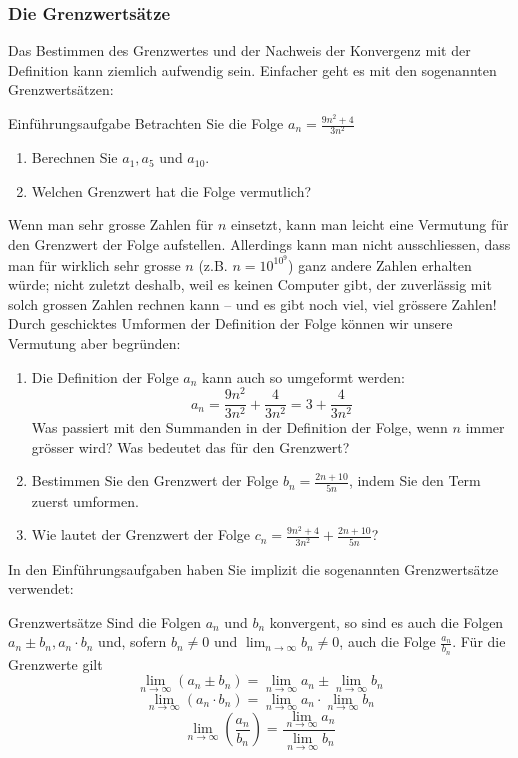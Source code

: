 \newpage
\subsubsection{Die Grenzwertsätze}
Das Bestimmen des Grenzwertes und der Nachweis der Konvergenz mit der Definition kann ziemlich aufwendig sein. Einfacher geht es mit den sogenannten Grenzwertsätzen:
\begin{LA}{Einführungsaufgabe}{}
	Betrachten Sie die Folge $a_n=\frac{9n^2+4}{3n^2}$
	\begin{enumerate}
		\item Berechnen Sie $a_1,a_5$ und $a_{10}$.
		\item Welchen Grenzwert hat die Folge vermutlich?
	\end{enumerate}
	Wenn man sehr grosse Zahlen für $n$ einsetzt, kann man leicht eine Vermutung für den Grenzwert der Folge aufstellen. Allerdings kann man nicht ausschliessen, dass man für wirklich sehr grosse $n$ (z.B. $n=10^{{10^9}}$) ganz andere Zahlen erhalten würde; nicht zuletzt deshalb, weil es keinen Computer gibt, der zuverlässig mit solch grossen Zahlen rechnen kann – und es gibt noch viel, viel grössere Zahlen! Durch geschicktes Umformen der Definition der Folge können wir unsere Vermutung aber begründen:
	\begin{enumerate}
		\item Die Definition der Folge $a_n$ kann auch so umgeformt werden:
		      $$a_n=\frac{9n^2}{3n^2}+\frac{4}{3n^2}=3 + \frac{4}{3n^2}$$
		      Was passiert mit den Summanden in der Definition der Folge, wenn $n$ immer grösser wird? Was bedeutet das für den Grenzwert?
		\item Bestimmen Sie den Grenzwert der Folge $b_n=\frac{2n+10}{5n}$, indem Sie den Term zuerst umformen.
		\item Wie lautet der Grenzwert der Folge $c_n= \frac{9n^2+4}{3n^2} + \frac{2n+10}{5n}$?
	\end{enumerate}
\end{LA}
\newpage
In den Einführungsaufgaben haben Sie implizit die sogenannten Grenzwertsätze verwendet:
\begin{satz}{Grenzwertsätze}{}
	Sind die Folgen $a_n$ und $b_n$ konvergent, so sind es auch die Folgen $a_n\pm b_n, a_n\cdot b_n$ und, sofern $b_n\neq 0$ und $\lim_{n\rightarrow \infty} b_n \neq 0$, auch die Folge $\frac{a_n}{b_n}$. Für die Grenzwerte gilt
	$$\lim_{n\rightarrow \infty} \left(a_n \pm b_n \right) = \lim_{n\rightarrow \infty} a_n \pm \lim_{n\rightarrow \infty} b_n $$
	$$\lim_{n\rightarrow \infty} \left(a_n \cdot b_n \right) = \lim_{n\rightarrow \infty} a_n \cdot \lim_{n\rightarrow \infty} b_n $$
	$$\lim_{n\rightarrow \infty} \left( \frac{a_n}{b_n} \right) = \frac{\lim_{n\rightarrow \infty} a_n}{\lim_{n\rightarrow \infty} b_n}$$
\end{satz}
